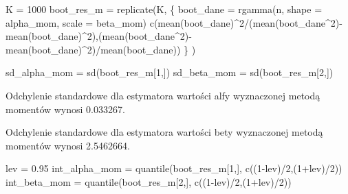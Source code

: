 \documentclass[
]{article}
\newenvironment{Shaded}{\begin{snugshade}}{\end{snugshade}}
\newcommand{\AttributeTok}[1]{\textcolor[rgb]{0.77,0.63,0.00}{#1}}
\newcommand{\DecValTok}[1]{\textcolor[rgb]{0.00,0.00,0.81}{#1}}
\newcommand{\FloatTok}[1]{\textcolor[rgb]{0.00,0.00,0.81}{#1}}
\newcommand{\FunctionTok}[1]{\textcolor[rgb]{0.00,0.00,0.00}{#1}}
\newcommand{\NormalTok}[1]{#1}
\newcommand{\OtherTok}[1]{\textcolor[rgb]{0.56,0.35,0.01}{#1}}
\newcommand{\SpecialCharTok}[1]{\textcolor[rgb]{0.00,0.00,0.00}{#1}}
\begin{document}
\begin{Shaded}
\begin{Highlighting}[]
\NormalTok{K }\OtherTok{=} \DecValTok{1000}
\NormalTok{boot\_res\_m }\OtherTok{=} \FunctionTok{replicate}\NormalTok{(K, \{}
\NormalTok{boot\_dane }\OtherTok{=} \FunctionTok{rgamma}\NormalTok{(n, }\AttributeTok{shape =}\NormalTok{ alpha\_mom, }\AttributeTok{scale =}\NormalTok{ beta\_mom)}
\FunctionTok{c}\NormalTok{(}\FunctionTok{mean}\NormalTok{(boot\_dane)}\SpecialCharTok{\^{}}\DecValTok{2}\SpecialCharTok{/}\NormalTok{(}\FunctionTok{mean}\NormalTok{(boot\_dane}\SpecialCharTok{\^{}}\DecValTok{2}\NormalTok{)}\SpecialCharTok{{-}}\FunctionTok{mean}\NormalTok{(boot\_dane)}\SpecialCharTok{\^{}}\DecValTok{2}\NormalTok{),(}\FunctionTok{mean}\NormalTok{(boot\_dane}\SpecialCharTok{\^{}}\DecValTok{2}\NormalTok{)}\SpecialCharTok{{-}}\FunctionTok{mean}\NormalTok{(boot\_dane)}\SpecialCharTok{\^{}}\DecValTok{2}\NormalTok{)}\SpecialCharTok{/}\FunctionTok{mean}\NormalTok{(boot\_dane))}
\NormalTok{\} )}

\NormalTok{sd\_alpha\_mom }\OtherTok{=} \FunctionTok{sd}\NormalTok{(boot\_res\_m[}\DecValTok{1}\NormalTok{,])}
\NormalTok{sd\_beta\_mom }\OtherTok{=} \FunctionTok{sd}\NormalTok{(boot\_res\_m[}\DecValTok{2}\NormalTok{,])}
\end{Highlighting}
\end{Shaded}

Odchylenie standardowe dla estymatora wartości alfy wyznaczonej metodą
momentów wynosi 0.033267.

Odchylenie standardowe dla estymatora wartości bety wyznaczonej metodą
momentów wynosi 2.5462664.

\begin{Shaded}
\begin{Highlighting}[]
\NormalTok{lev }\OtherTok{=} \FloatTok{0.95}
\NormalTok{int\_alpha\_mom }\OtherTok{=} \FunctionTok{quantile}\NormalTok{(boot\_res\_m[}\DecValTok{1}\NormalTok{,], }\FunctionTok{c}\NormalTok{((}\DecValTok{1}\SpecialCharTok{{-}}\NormalTok{lev)}\SpecialCharTok{/}\DecValTok{2}\NormalTok{,(}\DecValTok{1}\SpecialCharTok{+}\NormalTok{lev)}\SpecialCharTok{/}\DecValTok{2}\NormalTok{))}
\NormalTok{int\_beta\_mom }\OtherTok{=} \FunctionTok{quantile}\NormalTok{(boot\_res\_m[}\DecValTok{2}\NormalTok{,], }\FunctionTok{c}\NormalTok{((}\DecValTok{1}\SpecialCharTok{{-}}\NormalTok{lev)}\SpecialCharTok{/}\DecValTok{2}\NormalTok{,(}\DecValTok{1}\SpecialCharTok{+}\NormalTok{lev)}\SpecialCharTok{/}\DecValTok{2}\NormalTok{))}
\end{Highlighting}
\end{Shaded}
\end{document}
